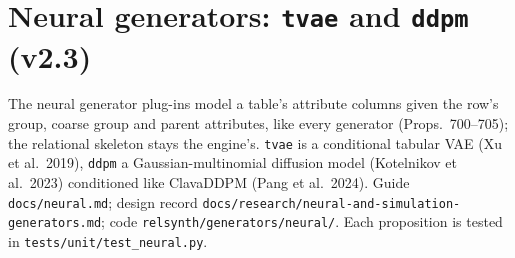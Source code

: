 \section{Neural generators: \texttt{tvae} and \texttt{ddpm} (v2.3)}\label{sec:neural}
\setcounter{savedpropneural}{\value{proposition}}
The neural generator plug-ins model a table's attribute columns given the row's group, coarse group and parent attributes, like every generator (Props.~700--705); the relational skeleton stays the engine's. \texttt{tvae} is a conditional tabular VAE (Xu et al.\ 2019), \texttt{ddpm} a Gaussian-multinomial diffusion model (Kotelnikov et al.\ 2023) conditioned like ClavaDDPM (Pang et al.\ 2024). Guide \texttt{docs/neural.md}; design record \texttt{docs/research/neural-and-simulation-generators.md}; code \texttt{relsynth/generators/neural/}. Each proposition is tested in \texttt{tests/unit/test\_neural.py}.

